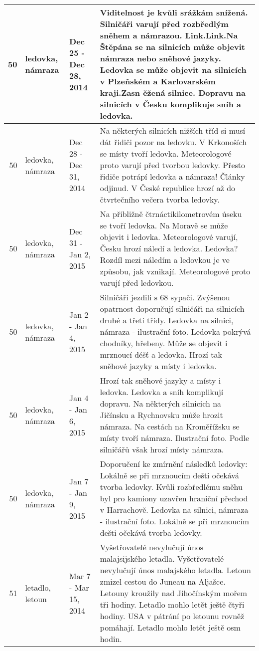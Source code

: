 \begin{tabularx}{\linewidth}{r m{2.5cm} X m{8cm}}
50 & ledovka, námraza & Dec 25 - Dec 28, 2014 & Viditelnost je kvůli srážkám snížená. Silničáři varují před rozbředlým sněhem a námrazou. Link.Link.Na Štěpána se na silnicích může objevit námraza nebo sněhové jazyky. Ledovka se může objevit na silnicích v Plzeňském a Karlovarském kraji.Zasn ěžená silnice. Dopravu na silnicích v Česku komplikuje sníh a ledovka. \\ \midrule
50 & ledovka, námraza & Dec 28 - Dec 31, 2014 & Na některých silnicích nižších tříd si musí dát řidiči pozor na ledovku. V Krkonoších se místy tvoří ledovka. Meteorologové proto varují před tvorbou ledovky. Přesto řidiče potrápí ledovka a námraza! Články odjinud. V České republice hrozí až do čtvrtečního večera tvorba ledovky. \\ \midrule
50 & ledovka, námraza & Dec 31 - Jan 2, 2015 & Na přibližně čtrnáctikilometrovém úseku se tvoří ledovka. Na Moravě se může objevit i ledovka. Meteorologové varují, Česku hrozí náledí a ledovka. Ledovka? Rozdíl mezi náledím a ledovkou je ve způsobu, jak vznikají. Meteorologové proto varují před ledovkou. \\ \midrule
50 & ledovka, námraza & Jan 2 - Jan 4, 2015 & Silničáři jezdili s 68 sypači. Zvýšenou opatrnost doporučují silničáři na silnicích druhé a třetí třídy. Ledovka na silnici, námraza - ilustrační foto. Ledovka pokrývá chodníky, hřebeny. Může se objevit i mrznoucí déšť a ledovka. Hrozí tak sněhové jazyky a místy i ledovka. \\ \midrule
50 & ledovka, námraza & Jan 4 - Jan 6, 2015 & Hrozí tak sněhové jazyky a místy i ledovka. Ledovka a sníh komplikují dopravu. Na některých silnicích na Jičínsku a Rychnovsku může hrozit námraza. Na cestách na Kroměřížsku se místy tvoří námraza. Ilustrační foto. Podle silničářů však hrozí místy námraza. \\ \midrule
50 & ledovka, námraza & Jan 7 - Jan 9, 2015 & Doporučení ke zmírnění následků ledovky: Lokálně se při mrznoucím dešti očekává tvorba ledovky. Kvůli rozbředlému sněhu byl pro kamiony uzavřen hraniční přechod v Harrachově. Ledovka na silnici, námraza - ilustrační foto. Lokálně se při mrznoucím dešti očekává tvorba ledovky. \\ \midrule
51 & letadlo, letoun & Mar 7 - Mar 15, 2014 & Vyšetřovatelé nevylučují únos malajsijského letadla. Vyšetřovatelé nevylučují únos malajského letadla. Letoun zmizel cestou do Juneau na Aljašce. Letouny kroužily nad Jihočínským mořem tři hodiny. Letadlo mohlo letět ještě čtyři hodiny. USA v pátrání po letounu rovněž pomáhají. Letadlo mohlo letět ještě osm hodin. \\ \midrule

\end{tabularx}

